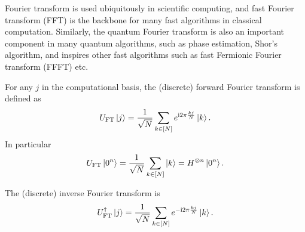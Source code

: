 Fourier transform is used ubiquitously in scientific computing, and fast Fourier transform (FFT) is the backbone for many fast algorithms in classical computation.
Similarly, the quantum Fourier transform is also an important component in many quantum algorithms, such as phase estimation, Shor's algorithm, and inspires other fast algorithms such as fast Fermionic Fourier transform (FFFT) etc.

For any $j$ in the computational basis, the (discrete) forward Fourier transform is defined as
\begin{equation}
U_{\mathrm{FT}}\ket{j}=\frac{1}{\sqrt{N}}\sum_{k\in [N]} e^{\mathrm{i} 2\pi\frac{kj}{N}} \ket{k}.
\end{equation}
In particular
\begin{equation}
  U_{\mathrm{FT}}\ket{0^n}=\frac{1}{\sqrt{N}}\sum_{k\in [N]} \ket{k}=H^{\otimes n}\ket{0^n}.
  \label{eqn:UFT_zeron}
\end{equation}


The (discrete) inverse Fourier transform is
\begin{equation}
U^{\dag}_{\mathrm{FT}}\ket{j}=\frac{1}{\sqrt{N}}\sum_{k\in [N]} e^{-\mathrm{i} 2\pi\frac{kj}{N}} \ket{k}.
\end{equation}

